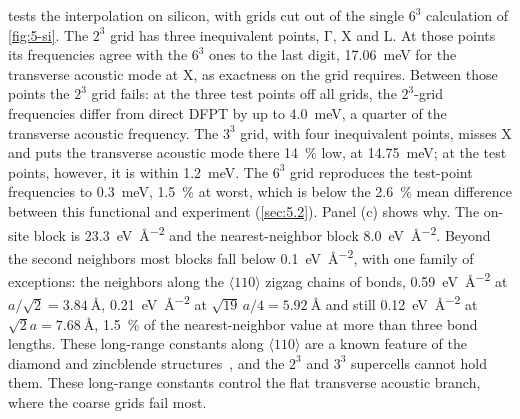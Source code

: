  tests the interpolation on silicon, with grids cut out of the single $6^3$ calculation of \cref{fig:5-si}. The $2^3$ grid has three inequivalent points, $\mathrm{\Gamma}$, X and L. At those points its frequencies agree with the $6^3$ ones to the last digit, \SI{17.06}{meV} for the transverse acoustic mode at X, as exactness on the grid requires. Between those points the $2^3$ grid fails: at the three test points off all grids, the $2^3$-grid frequencies differ from direct DFPT by up to \SI{4.0}{meV}, a quarter of the transverse acoustic frequency. The $3^3$ grid, with four inequivalent points, misses X and puts the transverse acoustic mode there \SI{14}{\percent} low, at \SI{14.75}{meV}; at the test points, however, it is within \SI{1.2}{meV}. The $6^3$ grid reproduces the test-point frequencies to \SI{0.3}{meV}, \SI{1.5}{\percent} at worst, which is below the \SI{2.6}{\percent} mean difference between this functional and experiment (\cref{sec:5.2}). Panel (c) shows why. The on-site block is \SI{23.3}{eV.\angstrom^{-2}} and the nearest-neighbor block \SI{8.0}{eV.\angstrom^{-2}}. Beyond the second neighbors most blocks fall below \SI{0.1}{eV.\angstrom^{-2}}, with one family of exceptions: the neighbors along the $\langle110\rangle$ zigzag chains of bonds, \SI{0.59}{eV.\angstrom^{-2}} at $a/\sqrt2 = \SI{3.84}{\angstrom}$, \SI{0.21}{eV.\angstrom^{-2}} at $\sqrt{19}\,a/4 = \SI{5.92}{\angstrom}$ and still \SI{0.12}{eV.\angstrom^{-2}} at $\sqrt2a = \SI{7.68}{\angstrom}$, \SI{1.5}{\percent} of the nearest-neighbor value at more than three bond lengths. These long-range constants along $\langle110\rangle$ are a known feature of the diamond and zincblende structures~\cite[Sect.~V.A.1]{baroni2001phonons}, and the $2^3$ and $3^3$ supercells cannot hold them. These long-range constants control the flat transverse acoustic branch, where the coarse grids fail most.

